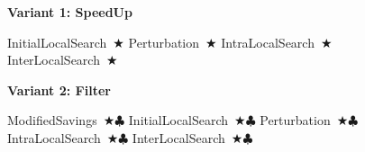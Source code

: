 
\newcommand{\twosym}{\ \(\bigstar\clubsuit\)}
\newcommand{\classsifiersym}{\ \(\bigstar\)}
\newcommand{\cpsym}{\ \(\clubsuit\)}

\newcommand{\BothState}[1]{\State #1\twosym}
\newcommand{\CPState}[1]{\State #1\cpsym}
\newcommand{\ClassifierState}[1]{\State #1\classsifiersym}


\begin{figure}[h]
    \centering

    \begin{minipage}[t]{0.45\textwidth}
        \textbf{Variant 1: SpeedUp}\par\vspace{0.5ex}
        \begin{algorithmic}[1]
            \ClassifierState{InitialLocalSearch}
            \ClassifierState{Perturbation}
            \ClassifierState{IntraLocalSearch}
            \ClassifierState{InterLocalSearch}
            \EndWhile
        \end{algorithmic}
        \captionsetup{type=algorithm,font=small}
        \label{alg:variant1}
    \end{minipage}
    \hfill
    \begin{minipage}[t]{0.45\textwidth}
        \textbf{Variant 2: Filter}\par\vspace{0.5ex}
        \begin{algorithmic}[1]
            \BothState{ModifiedSavings}
            \BothState{InitialLocalSearch}
            \BothState{Perturbation}
            \BothState{IntraLocalSearch}
            \BothState{InterLocalSearch}
            \EndWhile
        \end{algorithmic}
        \captionsetup{type=algorithm,font=small}
        \label{alg:variant2}
    \end{minipage}

    \vspace{2em} %


\end{figure}
